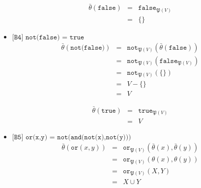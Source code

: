 \documentclass[a4paper,11pt]{article}
\begin{document}
\begin{itemize}
\begin{eqnarray*}
\bar \theta(\texttt{false}) & = & \texttt{false}_{\mathfrak{P}(V)} \\
                            & = & \{\}
\end{eqnarray*}

\item{$\texttt{[B4] not(false) = true}$}
\begin{eqnarray*}
\bar \theta(\texttt{not(false)}) & = & \texttt{not}_{\mathfrak{P}(V)}(\bar \theta(\texttt{false})) \\
                                 & = & \texttt{not}_{\mathfrak{P}(V)}(\texttt{false}_{\mathfrak{P}(V)}) \\
                                 & = & \texttt{not}_{\mathfrak{P}(V)}(\{\}) \\
                                 & = & V - \{\} \\
                                 & = & V
\end{eqnarray*}

\begin{eqnarray*}
\bar \theta(\texttt{true}) & = & \texttt{true}_{\mathfrak{P}(V)} \\
                            & = & V
\end{eqnarray*}

\item{$\texttt{[B5] or(x,y) = not(and(not(x),not(y)))}$}
\begin{eqnarray*}
\bar \theta(\texttt{or}(x,y)) & = & \texttt{or}_{\mathfrak{P}(V)}(\bar \theta(x), \bar \theta(y)) \\
                              & = & \texttt{or}_{\mathfrak{P}(V)}(\theta(x), \theta(y)) \\
                              & = & \texttt{or}_{\mathfrak{P}(V)}(X,Y) \\
                              & = & X \cup Y
\end{eqnarray*}


\end{itemize}
\end{document}
